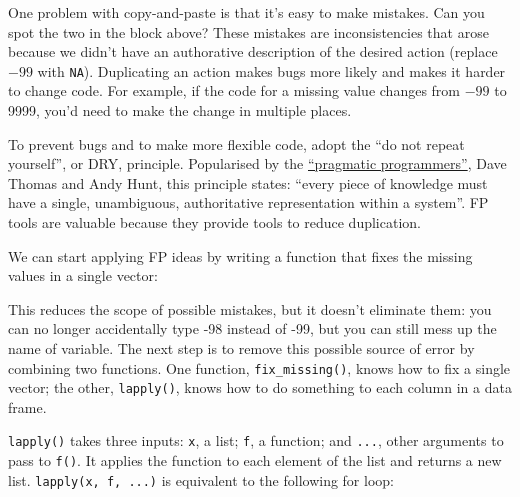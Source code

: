 One problem with copy-and-paste is that it's easy to make mistakes. Can
you spot the two in the block above? These mistakes are inconsistencies
that arose because we didn't have an authorative description of the
desired action (replace $-99$ with \texttt{NA}). Duplicating an action
makes bugs more likely and makes it harder to change code. For example,
if the code for a missing value changes from $-99$ to 9999, you'd need
to make the change in multiple places.

To prevent bugs and to make more flexible code, adopt the ``do not
repeat yourself'', or DRY, principle. Popularised by the
\href{http://pragprog.com/about}{``pragmatic programmers''}, Dave Thomas
and Andy Hunt, this principle states: ``every piece of knowledge must
have a single, unambiguous, authoritative representation within a
system''. FP tools are valuable because they provide tools to reduce
duplication.

We can start applying FP ideas by writing a function that fixes the
missing values in a single vector:

\begin{Shaded}
\begin{Highlighting}[]
\StringTok{ }
  \NormalTok{x[x ==}\StringTok{ }\NormalTok{-}\NormalTok{] <-}\StringTok{ }
\NormalTok{\}}
\StringTok{ }
\StringTok{ }
\StringTok{ }
\StringTok{ }
\StringTok{ }
\StringTok{ }
\end{Highlighting}
\end{Shaded}

This reduces the scope of possible mistakes, but it doesn't eliminate
them: you can no longer accidentally type -98 instead of -99, but you
can still mess up the name of variable. The next step is to remove this
possible source of error by combining two functions. One function,
\texttt{fix\_missing()}, knows how to fix a single vector; the other,
\texttt{lapply()}, knows how to do something to each column in a data
frame.

\texttt{lapply()} takes three inputs: \texttt{x}, a list; \texttt{f}, a
function; and \texttt{...}, other arguments to pass to \texttt{f()}. It
applies the function to each element of the list and returns a new list.
\texttt{lapply(x, f, ...)} is equivalent to the following for loop:


